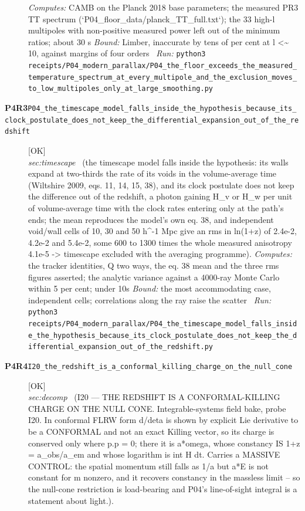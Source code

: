 \begin{description}
\emph{Computes:} CAMB on the Planck 2018 base parameters; the measured PR3 TT spectrum (`P04\_floor\_data/planck\_TT\_full.txt`); the 33 high-l multipoles with non-positive measured power left out of the minimum ratios; about 30 s
 \emph{Bound:} Limber, inaccurate by tens of per cent at l <\textasciitilde{} 10, against margins of four orders
\ \emph{Run:} \texttt{python3 receipts/P04\_modern\_parallax/P04\_the\_floor\_exceeds\_the\_measured\_temperature\_spectrum\_at\_every\_multipole\_and\_the\_exclusion\_moves\_to\_low\_multipoles\_only\_at\_large\_smoothing.py}
\item[\rcptlabel{P04_the_timescape_model_falls_inside_the_hypothesis_because_its_clock_postulate_does_not_keep_the_differential_expansion_out_of_the_redshift}{P4R3}\textbf{P4R3}\quad\texttt{P04\_the\_timescape\_model\_falls\_inside\_the\_hypothesis\_because\_its\_clock\_postulate\_does\_not\_keep\_the\_differential\_expansion\_out\_of\_the\_redshift}]\hfill\textsf{[OK]}\\
\textit{sec:timescape} \ (the timescape model falls inside the hypothesis: its walls expand at two-thirds the rate of its voids in the volume-average time (Wiltshire 2009, eqs. 11, 14, 15, 38), and its clock postulate does not keep the difference out of the redshift, a photon gaining H\_v or H\_w per unit of volume-average time with the clock rates entering only at the path's ends; the mean reproduces the model's own eq. 38, and independent void/wall cells of 10, 30 and 50 h\textasciicircum{}-1 Mpc give an rms in ln(1+z) of 2.4e-2, 4.2e-2 and 5.4e-2, some 600 to 1300 times the whole measured anisotropy 4.1e-5 -> timescape excluded with the averaging programme). 
\emph{Computes:} the tracker identities, Q two ways, the eq. 38 mean and the three rms figures asserted; the analytic variance against a 4000-ray Monte Carlo within 5 per cent; under 10s
 \emph{Bound:} the most accommodating case, independent cells; correlations along the ray raise the scatter
\ \emph{Run:} \texttt{python3 receipts/P04\_modern\_parallax/P04\_the\_timescape\_model\_falls\_inside\_the\_hypothesis\_because\_its\_clock\_postulate\_does\_not\_keep\_the\_differential\_expansion\_out\_of\_the\_redshift.py}
\item[\rcptlabel{I20_the_redshift_is_a_conformal_killing_charge_on_the_null_cone}{P4R4}\textbf{P4R4}\quad\texttt{I20\_the\_redshift\_is\_a\_conformal\_killing\_charge\_on\_the\_null\_cone}]\hfill\textsf{[OK]}\\
\textit{sec:decomp} \ (I20 --- THE REDSHIFT IS A CONFORMAL-KILLING CHARGE ON THE NULL CONE. Integrable-systems field bake, probe I20. In conformal FLRW form d/deta is shown by explicit Lie derivative to be a CONFORMAL and not an exact Killing vector, so its charge is conserved only where p.p = 0; there it is a*omega, whose constancy IS 1+z = a\_obs/a\_em and whose logarithm is int H dt. Carries a MASSIVE CONTROL: the spatial momentum still falls as 1/a but a*E is not constant for m nonzero, and it recovers constancy in the massless limit -- so the null-cone restriction is load-bearing and P04's line-of-sight integral is a statement about light.). 

\end{description}
